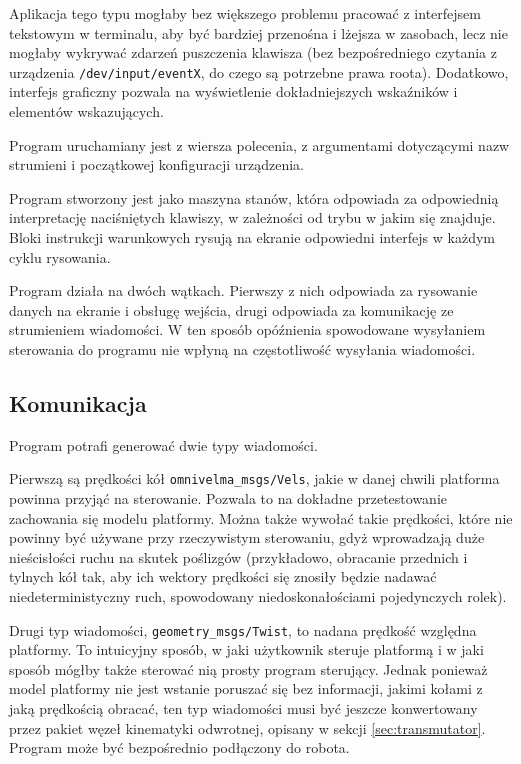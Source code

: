 		Aplikacja tego typu mogłaby bez większego problemu pracować z interfejsem tekstowym w terminalu, aby być bardziej przenośna i lżejsza w zasobach, 
		lecz nie mogłaby wykrywać zdarzeń puszczenia klawisza
		(bez bezpośredniego czytania z urządzenia \texttt{/dev/input/eventX}, do czego są potrzebne prawa roota). 
		Dodatkowo, interfejs graficzny pozwala na wyświetlenie dokładniejszych wskaźników i elementów wskazujących.
		
		Program uruchamiany jest z wiersza polecenia, z argumentami dotyczącymi nazw strumieni i początkowej konfiguracji urządzenia.
		
		Program stworzony jest jako maszyna stanów, która odpowiada za odpowiednią interpretację naciśniętych klawiszy, w zależności od trybu w jakim się znajduje.
		Bloki instrukcji warunkowych rysują na ekranie odpowiedni interfejs w każdym cyklu rysowania.
		
		Program działa na dwóch wątkach.
		Pierwszy z nich odpowiada za rysowanie danych na ekranie i obsługę wejścia, drugi odpowiada za komunikację ze strumieniem wiadomości.
		W ten sposób opóźnienia spowodowane wysyłaniem sterowania do programu nie wpłyną na częstotliwość wysyłania wiadomości.
	
	\subsection{Komunikacja}
		Program potrafi generować dwie typy wiadomości.
		
		Pierwszą są prędkości kół \texttt{omnivelma\_msgs/Vels}, jakie w danej chwili platforma powinna przyjąć na sterowanie.
		Pozwala to na dokładne przetestowanie zachowania się modelu platformy.
		Można także wywołać takie prędkości, które nie powinny być używane przy rzeczywistym sterowaniu, gdyż wprowadzają duże nieścisłości ruchu na skutek poślizgów
		(przykładowo, obracanie przednich i tylnych kół tak, aby ich wektory prędkości się znosiły będzie nadawać niedeterministyczny ruch, spowodowany niedoskonałościami
		pojedynczych rolek).
		
		Drugi typ wiadomości, \texttt{geometry\_msgs/Twist}, to nadana prędkość względna platformy.
		To intuicyjny sposób, w jaki użytkownik steruje platformą i w jaki sposób mógłby także sterować nią prosty program sterujący.
		Jednak ponieważ model platformy nie jest wstanie poruszać się bez informacji, jakimi kołami z jaką prędkością obracać,
		ten typ wiadomości musi być jeszcze konwertowany przez pakiet węzeł kinematyki odwrotnej, opisany w sekcji \ref{sec:transmutator}.
		Program może być bezpośrednio podłączony do robota.
		
